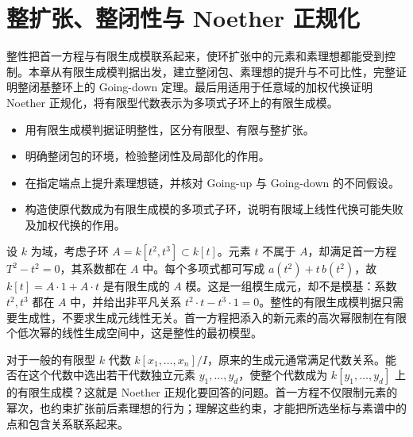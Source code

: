 
\chapter{整扩张、整闭性与 Noether 正规化}\label{b3:ch:05}

\begin{chapterabstract}
	整性把首一方程与有限生成模联系起来，使环扩张中的元素和素理想都能受到控制。本章从有限生成模判据出发，建立整闭包、素理想的提升与不可比性，完整证明整闭基整环上的 Going-down 定理。最后用适用于任意域的加权代换证明 Noether 正规化，将有限型代数表示为多项式子环上的有限生成模。
\end{chapterabstract}

\begin{learninggoals}
	\begin{itemize}
		\item 用有限生成模判据证明整性，区分有限型、有限与整扩张。
		\item 明确整闭包的环境，检验整闭性及局部化的作用。
		\item 在指定端点上提升素理想链，并核对 Going-up 与 Going-down 的不同假设。
		\item 构造使原代数成为有限生成模的多项式子环，说明有限域上线性代换可能失败及加权代换的作用。
	\end{itemize}
\end{learninggoals}

设 \(k\) 为域，考虑子环 \(A=k[t^2,t^3]\subset k[t]\)。元素 \(t\) 不属于 \(A\)，却满足首一方程 \(T^2-t^2=0\)，其系数都在 \(A\) 中。每个多项式都可写成 \(a(t^2)+t\,b(t^2)\)，故 \(k[t]=A\cdot1+A\cdot t\) 是有限生成的 \(A\) 模。这是一组模生成元，却不是模基：系数 \(t^2,t^3\) 都在 \(A\) 中，并给出非平凡关系 \(t^2\cdot t-t^3\cdot1=0\)。整性的有限生成模判据只需要生成性，不要求生成元线性无关。首一方程把添入的新元素的高次幂限制在有限个低次幂的线性生成空间中，这是整性的最初模型。

\ProseParagraphBreak

对于一般的有限型 \(k\) 代数 \(k[x_1,\ldots,x_n]/I\)，原来的生成元通常满足代数关系。能否在这个代数中选出若干代数独立元素 \(y_1,\ldots,y_d\)，使整个代数成为 \(k[y_1,\ldots,y_d]\) 上的有限生成模？这就是 Noether 正规化要回答的问题。首一方程不仅限制元素的幂次，也约束扩张前后素理想的行为；理解这些约束，才能把所选坐标与素谱中的点和包含关系联系起来。

\ProseParagraphBreak


